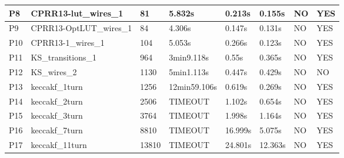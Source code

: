 \documentclass[pagesize, english, fontsize=10pt, DIV=25]{scrartcl}
\begin{document}
\begin{table}[]
{\begin{tabular}{|l|l|l|l|l|l|l|l|}
P8                               & CPRR13-lut\_wires\_1                          & 81                   & 5.832s       & 0.213s     & 0.155s         & NO                             & YES                            \\ \hline
P9                              & CPRR13-OptLUT\_wires\_1                       & 84                   & 4.306s       & 0.147s     & 0.131s         & NO                             & YES                            \\ \hline
P10                              & CPRR13-1\_wires\_1                            & 104                  & 5.053s       & 0.266s     & 0.123s         & NO                             & YES                            \\ \hline
P11                              & KS\_transitions\_1                            & 964                  & 3min9.118s   & 0.55s      & 0.365s         & NO                             & YES                            \\ \hline
P12                              & KS\_wires\_2                                  & 1130                 & 5min1.113s   & 0.447s     & 0.429s         & NO                             & NO                             \\ \hline
P13                              & keccakf\_1turn                                & 1256                 & 12min59.106s & 0.619s     & 0.269s         & NO                             & YES                            \\ \hline
P14                              & keccakf\_2turn                                & 2506                 & TIMEOUT      & 1.102s     & 0.654s         & NO                             & YES                             \\ \hline
P15                              & keccakf\_3turn                                & 3764                 & TIMEOUT      & 1.998s     & 1.164s         & NO                             & YES                             \\ \hline
P16                              & keccakf\_7turn                                & 8810                 & TIMEOUT      & 16.999s    & 5.075s         & NO                             & YES                             \\ \hline
P17                              & keccakf\_11turn                               & 13810                & TIMEOUT      & 24.801s    & 12.363s        & NO                             & YES                             \\ \hline

\end{tabular}}
\end{table}
\end{document}

